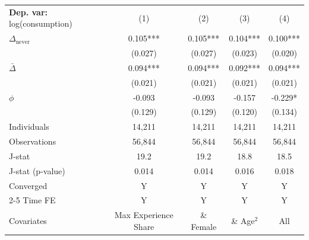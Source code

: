 \begin{tabular}{l cccc} \toprule  \textbf{Dep. var:}  log(consumption) 
                    &\multicolumn{1}{c}{(1)}   &\multicolumn{1}{c}{(2)}   &\multicolumn{1}{c}{(3)}   &\multicolumn{1}{c}{(4)}   \\

\addlinespace
$\Delta_{\text{never}}$&       0.105***&       0.105***&       0.104***&       0.100***\\
                    &     (0.027)   &     (0.027)   &     (0.023)   &     (0.020)   \\

\addlinespace
$\bar{\Delta}$      &       0.094***&       0.094***&       0.092***&       0.094***\\
                    &     (0.021)   &     (0.021)   &     (0.021)   &     (0.021)   \\

\addlinespace
$\phi$              &      -0.093   &      -0.093   &      -0.157   &      -0.229*  \\
                    &     (0.129)   &     (0.129)   &     (0.120)   &     (0.134)   \\
\addlinespace
Individuals         &      14,211   &      14,211   &      14,211   &      14,211   \\
Observations        &      56,844   &      56,844   &      56,844   &      56,844   \\
J-stat              &        19.2   &        19.2   &        18.8   &        18.5   \\
J-stat (p-value)    &       0.014   &       0.014   &       0.016   &       0.018   \\
Converged           &           Y   &           Y   &           Y   &           Y   \\
\cmidrule{2-5} Time FE & Y & Y & Y & Y \\ Covariates & Max Experience Share & \& Female & \& Age$^2$ & All \\ \bottomrule \end{tabular}
